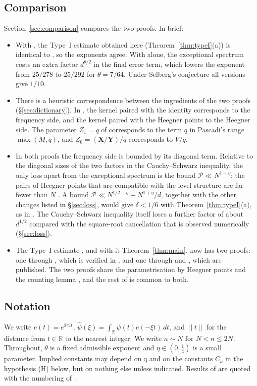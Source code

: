 \documentclass[11pt]{amsart}
\theoremstyle{remark}
\theoremstyle{definition}
\numberwithin{equation}{section}
\newcommand{\Pc}{\mathcal{P}}
\newcommand{\R}{\mathbb{R}}
\newcommand{\bX}{\mathbf{X}}
\newcommand{\bY}{\mathbf{Y}}
\begin{document}
\subsection{Comparison}
Section~\ref{sec:comparison} compares the two proofs. In brief:
\begin{itemize}
\item With \cite[Theorem~2]{Pas}, the Type~I estimate obtained here (Theorem~\ref{thm:typeI}(a)) is identical to \cite[Proposition~6.5]{II}, so the exponents agree. With \cite{DI} alone, the exceptional spectrum costs an extra factor $d^{\theta/2}$ in the final error term, which lowers the exponent from $25/278$ to $25/292$ for $\theta=7/64$. Under Selberg's conjecture all versions give $1/10$.
\item There is a heuristic correspondence between the ingredients of the two proofs (\S\ref{sec:dictionary}). In \cite[Theorem~8.1]{GM1}, the kernel paired with the identity corresponds to the frequency side, and the kernel paired with the Heegner points to the Heegner side. The parameter $Z_1=q$ of \cite{II} corresponds to the term $q$ in Pascadi's range $\max(M,q)$, and $Z_0=(\bX/\bY)/q$ corresponds to $V/q$.
\item In both proofs the frequency side is bounded by its diagonal term. Relative to the diagonal sizes of the two factors in the Cauchy--Schwarz inequality, the only loss apart from the exceptional spectrum is the bound $\Pc\ll N^{1+\eta}$; the pairs of Heegner points that are compatible with the level structure are far fewer than $N$ \cite[\S9]{II}. A bound $\Pc\ll N^{1/2+\eta}+N^{1+\eta}/d$, together with the other changes listed in \S\ref{sec:loss}, would give $\delta<1/6$ with Theorem~\ref{thm:typeI}(a), as in \cite{II}. The Cauchy--Schwarz inequality itself loses a further factor of about $d^{1/2}$ compared with the square-root cancellation that is observed numerically (\S\ref{sec:loss}).
\item The Type~I estimate \cite[Proposition~6.5]{II}, and with it Theorem~\ref{thm:main}, now has two proofs: one through \cite{GM1}, which is verified in \cite{V}, and one through \cite{DI} and \cite{Pas}, which are published. The two proofs share the parametrisation by Heegner points and the counting lemma \cite[Lemma~6.4]{II}, and the rest of \cite{II} is common to both.
\end{itemize}

\subsection{Notation}
We write $e(t)=e^{2\pi it}$, $\hat\psi(\xi)=\int_\R\psi(t)e(-\xi t)\,dt$, and $\|t\|$ for the distance from $t\in\R$ to the nearest integer. We write $n\sim N$ for $N<n\le2N$. Throughout, $\theta$ is a fixed admissible exponent and $\eta\in(0,\frac14)$ is a small parameter. Implied constants may depend on $\eta$ and on the constants $C_\nu$ in the hypothesis (H) below, but on nothing else unless indicated. Results of \cite{II} are quoted with the numbering of \cite{II}.
\end{document}
